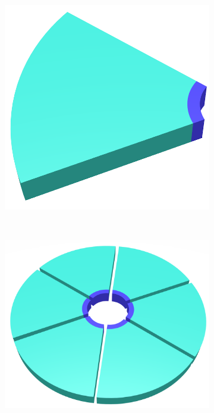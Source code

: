 \documentclass{article}
\begin{document}
\begin{figure}
\begin{subfigure}{0.3\linewidth}
		\includegraphics[width=\textwidth]{wedge.png}
		\caption{}~\label{fig:wedge}
	\end{subfigure}
		\begin{subfigure}{0.4\linewidth}
		\centering
		\includegraphics[width=\textwidth]{layer_blender.png}
		\caption{}~\label{fig:wedge_layer}
	\end{subfigure}
	\begin{subfigure}{0.4\linewidth}

\end{subfigure}
\end{figure}
\end{document}
